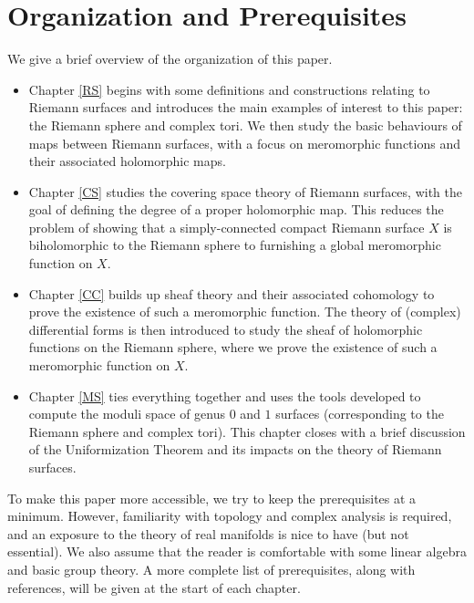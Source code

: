\documentclass[../Moduli_Spaces_of_Riemann_Surfaces.tex]{subfiles}
\begin{document}
    \section{Organization and Prerequisites}
    We give a brief overview of the organization of this paper.
    \begin{itemize}
        \item Chapter \ref{RS} begins with some definitions and constructions relating to Riemann surfaces and introduces the main examples of interest to this paper: the Riemann sphere and complex tori. We then study the basic behaviours of maps between Riemann surfaces, with a focus on meromorphic functions and their associated holomorphic maps.
            \vspace{-0.05in}
        \item Chapter \ref{CS} studies the covering space theory of Riemann surfaces, with the goal of defining the degree of a proper holomorphic map. This reduces the problem of showing that a simply-connected compact Riemann surface $X$ is biholomorphic to the Riemann sphere to furnishing a global meromorphic function on $X$.
            \vspace{-0.05in}
        \item Chapter \ref{CC} builds up sheaf theory and their associated cohomology to prove the existence of such a meromorphic function. The theory of (complex) differential forms is then introduced to study the sheaf of holomorphic functions on the Riemann sphere, where we prove the existence of such a meromorphic function on $X$.
            \vspace{-0.05in}
        \item Chapter \ref{MS} ties everything together and uses the tools developed to compute the moduli space of genus $0$ and $1$ surfaces (corresponding to the Riemann sphere and complex tori). This chapter closes with a brief discussion of the Uniformization Theorem and its impacts on the theory of Riemann surfaces.
    \end{itemize}
    To make this paper more accessible, we try to keep the prerequisites at a minimum. However, familiarity with topology and complex analysis is required, and an exposure to the theory of real manifolds is nice to have (but not essential). We also assume that the reader is comfortable with some linear algebra and basic group theory. A more complete list of prerequisites, along with references, will be given at the start of each chapter.
\end{document}
